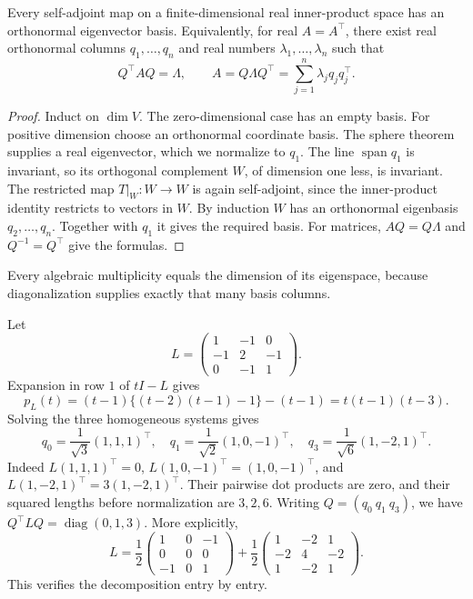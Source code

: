 \begin{theorem}\label{thm:09:spectral}
Every self-adjoint map on a finite-dimensional real inner-product space
has an orthonormal eigenvector basis. Equivalently, for real
\(A=A^\top\), there exist real orthonormal columns \(q_1,\ldots,q_n\)
and real numbers \(\lambda_1,\ldots,\lambda_n\) such that
\[
 Q^\top AQ=\Lambda,\qquad A=Q\Lambda Q^\top
       =\sum_{j=1}^n\lambda_jq_jq_j^\top .
\]
\end{theorem}
\begin{proof}
Induct on \(\dim V\). The zero-dimensional case has an empty basis.
For positive dimension choose an orthonormal coordinate basis.
The sphere theorem supplies a real eigenvector, which we normalize to
\(q_1\). The line \(\operatorname{span}q_1\) is invariant, so its
orthogonal complement \(W\), of dimension one less, is invariant.
The restricted map \(T|_W:W\to W\) is again self-adjoint, since the
inner-product identity restricts to vectors in \(W\).
By induction \(W\) has an orthonormal eigenbasis \(q_2,\ldots,q_n\).
Together with \(q_1\) it gives the required basis.
For matrices, \(AQ=Q\Lambda\) and \(Q^{-1}=Q^\top\) give the formulas.
\end{proof}
Every algebraic multiplicity equals the dimension of its eigenspace,
because diagonalization supplies exactly that many basis columns.

\begin{example}
Let
\[
 L=\begin{pmatrix}1&-1&0\\-1&2&-1\\0&-1&1\end{pmatrix}.
\]
Expansion in row \(1\) of \(tI-L\) gives
\[
 p_L(t)=(t-1)\{(t-2)(t-1)-1\}-(t-1)
       =t(t-1)(t-3).
\]
Solving the three homogeneous systems gives
\[
 q_0=\frac1{\sqrt3}(1,1,1)^\top,\quad
 q_1=\frac1{\sqrt2}(1,0,-1)^\top,\quad
 q_3=\frac1{\sqrt6}(1,-2,1)^\top.
\]
Indeed \(L(1,1,1)^\top=0\),
\(L(1,0,-1)^\top=(1,0,-1)^\top\), and
\(L(1,-2,1)^\top=3(1,-2,1)^\top\).
Their pairwise dot products are zero, and their squared lengths before
normalization are \(3,2,6\).
Writing \(Q=(q_0\ q_1\ q_3)\), we have
\(Q^\top LQ=\operatorname{diag}(0,1,3)\). More explicitly,
\[
 L=\frac12\begin{pmatrix}1&0&-1\\0&0&0\\-1&0&1\end{pmatrix}
  +\frac12\begin{pmatrix}1&-2&1\\-2&4&-2\\1&-2&1\end{pmatrix}.
\]
This verifies the decomposition entry by entry.
\end{example}

